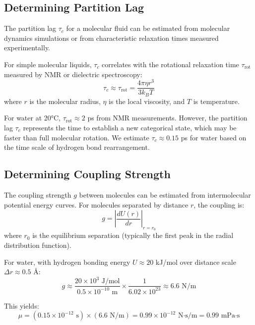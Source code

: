 \documentclass[twocolumn,superscriptaddress,prb,10pt]{revtex4-2}
\begin{document}
\subsection{Determining Partition Lag}

The partition lag $\tau_c$ for a molecular fluid can be estimated from molecular dynamics simulations or from characteristic relaxation times measured experimentally.

For simple molecular liquids, $\tau_c$ correlates with the rotational relaxation time $\tau_{\text{rot}}$ measured by NMR or dielectric spectroscopy:
\begin{equation}
\tau_c \approx \tau_{\text{rot}} = \frac{4\pi \eta r^3}{3 k_B T}
\label{eq:tau_rot}
\end{equation}
where $r$ is the molecular radius, $\eta$ is the local viscosity, and $T$ is temperature.

For water at 20°C, $\tau_{\text{rot}} \approx 2$ ps from NMR measurements. However, the partition lag $\tau_c$ represents the time to establish a new categorical state, which may be faster than full molecular rotation. We estimate $\tau_c \approx 0.15$ ps for water based on the time scale of hydrogen bond rearrangement.

\subsection{Determining Coupling Strength}

The coupling strength $g$ between molecules can be estimated from intermolecular potential energy curves. For molecules separated by distance $r$, the coupling is:
\begin{equation}
g = \left|\frac{dU(r)}{dr}\right|_{r=r_0}
\label{eq:coupling_potential}
\end{equation}
where $r_0$ is the equilibrium separation (typically the first peak in the radial distribution function).

For water, with hydrogen bonding energy $U \approx 20$ kJ/mol over distance scale $\Delta r \approx 0.5$ Å:
\begin{equation}
g \approx \frac{20 \times 10^3 \text{ J/mol}}{0.5 \times 10^{-10} \text{ m}} \times \frac{1}{6.02 \times 10^{23}} \approx 6.6 \text{ N/m}
\label{eq:g_water}
\end{equation}

This yields:
\begin{equation}
\mu = (0.15 \times 10^{-12} \text{ s}) \times (6.6 \text{ N/m}) = 0.99 \times 10^{-12} \text{ N·s/m} = 0.99 \text{ mPa·s}
\label{eq:mu_water}
\end{equation}
\end{document}
